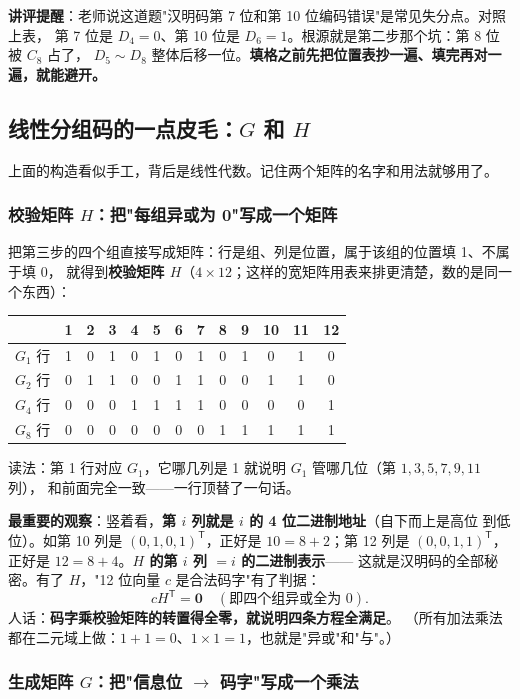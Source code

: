 \textbf{讲评提醒}：老师说这道题"汉明码第 7 位和第 10 位编码错误"是常见失分点。对照上表，
第 7 位是 $D_4=0$、第 10 位是 $D_6=1$。根源就是第二步那个坑：第 8 位被 $C_8$ 占了，
$D_5\sim D_8$ 整体后移一位。\textbf{填格之前先把位置表抄一遍、填完再对一遍，就能避开。}

\subsection{线性分组码的一点皮毛：$G$ 和 $H$}

上面的构造看似手工，背后是线性代数。记住两个矩阵的名字和用法就够用了。

\subsubsection{校验矩阵 $H$：把"每组异或为 0"写成一个矩阵}

把第三步的四个组直接写成矩阵：行是组、列是位置，属于该组的位置填 1、不属于填 0，
就得到\textbf{校验矩阵 $H$}（$4\times12$；这样的宽矩阵用表来排更清楚，数的是同一个东西）：

\begin{center}\small
\setlength{\tabcolsep}{4pt}
\begin{tabular}{@{}c*{12}{c}@{}}
\toprule
 & 1&2&3&4&5&6&7&8&9&10&11&12\\
\midrule
$G_1$ 行 & 1&0&1&0&1&0&1&0&1&0&1&0\\
$G_2$ 行 & 0&1&1&0&0&1&1&0&0&1&1&0\\
$G_4$ 行 & 0&0&0&1&1&1&1&0&0&0&0&1\\
$G_8$ 行 & 0&0&0&0&0&0&0&1&1&1&1&1\\
\bottomrule
\end{tabular}
\end{center}

读法：第 1 行对应 $G_1$，它哪几列是 1 就说明 $G_1$ 管哪几位（第 $1,3,5,7,9,11$ 列），
和前面完全一致——一行顶替了一句话。

\textbf{最重要的观察}：竖着看，\textbf{第 $i$ 列就是 $i$ 的 4 位二进制地址}（自下而上是高位
到低位）。如第 10 列是 $(0,1,0,1)^{\mathsf T}$，正好是 $10=8+2$；第 12 列是
$(0,0,1,1)^{\mathsf T}$，正好是 $12=8+4$。\textbf{$H$ 的第 $i$ 列 $=i$ 的二进制表示}——
这就是汉明码的全部秘密。有了 $H$，"12 位向量 $c$ 是合法码字"有了判据：
\[
cH^{\mathsf T}=\mathbf{0}\quad(\text{即四个组异或全为 }0).
\]
人话：\textbf{码字乘校验矩阵的转置得全零，就说明四条方程全满足}。
（所有加法乘法都在二元域上做：$1+1=0$、$1\times1=1$，也就是"异或"和"与"。）

\subsubsection{生成矩阵 $G$：把"信息位 $\to$ 码字"写成一个乘法}

